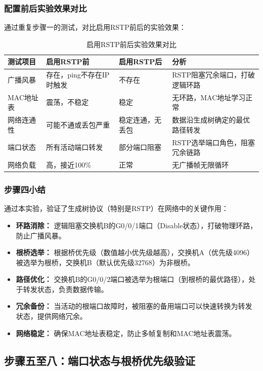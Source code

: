 \documentclass[a4paper]{article}
\begin{document}
\subsubsection{配置前后实验效果对比}

通过重复步骤一的测试，对比启用RSTP前后的实验效果：
\begin{table}[H]
    \centering
    \small
    \setlength{\tabcolsep}{2pt}
    \begin{tabular}{|p{2.5cm}|p{3.5cm}|p{3.5cm}|p{4cm}|}
        \hline
        测试项目 & 启用RSTP前 & 启用RSTP后 & 分析 \\
        \hline
        广播风暴 & 存在，ping不存在IP时触发 & 不存在 & RSTP阻塞冗余端口，打破逻辑环路 \\
        \hline
        MAC地址表 & 震荡，不稳定 & 稳定 & 无环路，MAC地址学习正常 \\
        \hline
        网络连通性 & 可能不通或丢包严重 & 稳定连通，无丢包 & 数据沿生成树确定的最优路径转发 \\
        \hline
        端口状态 & 所有活动端口转发 & 部分端口阻塞 & RSTP选举端口角色，阻塞冗余链路 \\
        \hline
        网络负载 & 高，接近100\% & 正常 & 无广播帧无限循环 \\
        \hline
    \end{tabular}
    \caption{启用RSTP前后实验效果对比}
\end{table}
\subsubsection{步骤四小结}
通过本实验，验证了生成树协议（特别是RSTP）在网络中的关键作用：
\begin{itemize}
    \item \textbf{环路消除：} 逻辑阻塞交换机B的G0/0/1端口（Disable状态），打破物理环路，防止广播风暴。
    \item \textbf{根桥选举：} 根据桥优先级（数值越小优先级越高），交换机A（优先级4096）被选举为根桥，交换机B（默认优先级32768）为非根桥。
    \item \textbf{路径优化：} 交换机B的G0/0/2端口被选举为根端口（到根桥的最优路径），处于转发状态，负责数据传输。
    \item \textbf{冗余备份：} 当活动的根端口故障时，被阻塞的备用端口可以快速转换为转发状态，提供网络冗余。
    \item \textbf{网络稳定：} 确保MAC地址表稳定，防止多帧复制和MAC地址表震荡。
\end{itemize}

\subsection{步骤五至八：端口状态与根桥优先级验证}
\end{document}
